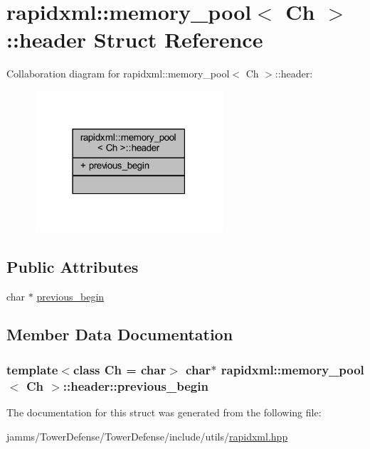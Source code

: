 \hypertarget{structrapidxml_1_1memory__pool_1_1header}{\section{rapidxml\+:\+:memory\+\_\+pool$<$ Ch $>$\+:\+:header Struct Reference}
\label{structrapidxml_1_1memory__pool_1_1header}
}


Collaboration diagram for rapidxml\+:\+:memory\+\_\+pool$<$ Ch $>$\+:\+:header\+:
\nopagebreak
\begin{figure}[H]
\begin{center}
\leavevmode
\includegraphics[width=198pt]{structrapidxml_1_1memory__pool_1_1header__coll__graph}
\end{center}
\end{figure}
\subsection*{Public Attributes}
\begin{DoxyCompactItemize}
\item 
char $\ast$ \hyperlink{structrapidxml_1_1memory__pool_1_1header_a3035f6741bb38f91c7f2efd05398c23d}{previous\+\_\+begin}
\end{DoxyCompactItemize}


\subsection{Member Data Documentation}
\hypertarget{structrapidxml_1_1memory__pool_1_1header_a3035f6741bb38f91c7f2efd05398c23d}{
\subsubsection[{previous\+\_\+begin}]{\setlength{\rightskip}{0pt plus 5cm}template$<$class Ch  = char$>$ char$\ast$ {\bf rapidxml\+::memory\+\_\+pool}$<$ Ch $>$\+::header\+::previous\+\_\+begin}}\label{structrapidxml_1_1memory__pool_1_1header_a3035f6741bb38f91c7f2efd05398c23d}


The documentation for this struct was generated from the following file\+:\begin{DoxyCompactItemize}
\item 
jamms/\+Tower\+Defense/\+Tower\+Defense/include/utils/\hyperlink{rapidxml_8hpp}{rapidxml.\+hpp}\end{DoxyCompactItemize}
